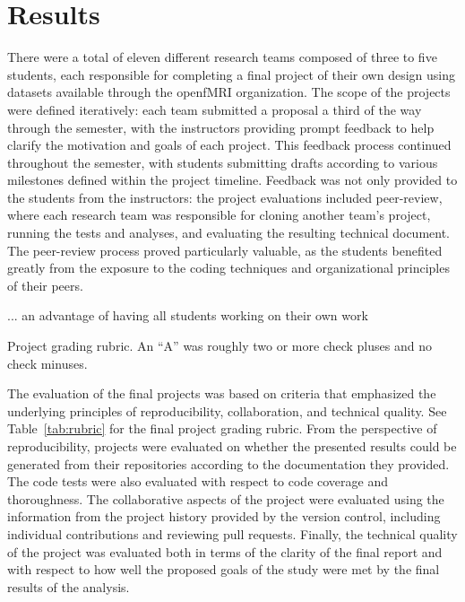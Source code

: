 \section{Results}\label{results}

There were a total of eleven different research teams composed of three
to five students, each responsible for completing a final project of their
own design using datasets available through the openfMRI organization.
The scope of the projects were defined iteratively: each team submitted a 
proposal a third of the way through the semester, with the instructors providing
prompt feedback to help clarify the motivation and goals of each project.
This feedback process continued throughout the semester, with students 
submitting drafts according to various milestones defined within the project
timeline.
Feedback was not only provided to the students from the instructors: the
project evaluations included peer-review, where each research team was
responsible for cloning another team's project, running the tests and analyses,
and evaluating the resulting technical document.
The peer-review process proved particularly valuable, as the students 
benefited greatly from the exposure to the coding techniques and 
organizational principles of their peers.

... an advantage of having all students working on their own work

\begin{table}
\centering
\begin{tiny}

\caption{Project grading rubric.
An ``A'' was roughly two or more check pluses and no check minuses.}
\label{tab:rubric}
\end{tiny}
\end{table}

The evaluation of the final projects was based on criteria that emphasized the
underlying principles of reproducibility, collaboration, and technical
quality.
See Table~\ref{tab:rubric} for the final project grading rubric.
From the perspective of reproducibility, projects were evaluated on whether the
presented results could be generated from their repositories according to the
documentation they provided.
The code tests were also evaluated with respect to code coverage
and thoroughness.
The collaborative aspects of the project were evaluated using the information
from the project history provided by the version control, including
individual contributions and reviewing pull requests.
Finally, the technical quality of the project was evaluated both in terms of
the clarity of the final report and with respect to how well the proposed
goals of the study were met by the final results of the analysis.

